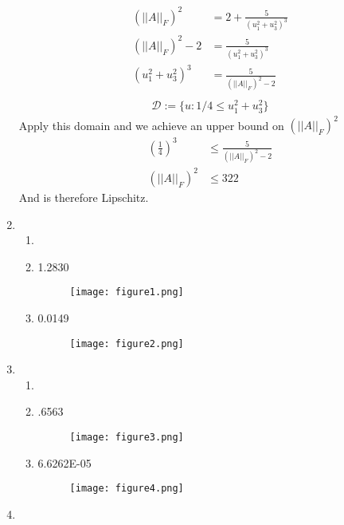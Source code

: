\documentclass{article}
\begin{document}
\begin{enumerate}
\begin{equation*}
\begin{split}
(\left|\left| A\right|\right|_{F})^{2} & = 2 + \frac{5}{(u_{1}^{2}+u_{3}^{2})^{3}}\\
(\left|\left| A\right|\right|_{F})^{2}-2 & = \frac{5}{(u_{1}^{2}+u_{3}^{2})^{3}}\\
(u_{1}^{2}+u_{3}^{2})^{3} & = \frac{5}{(\left|\left| A\right|\right|_{F})^{2}-2}\\
\end{split}
\end{equation*}
\begin{equation*}
\begin{split}
\mathcal{D} := \{u: 1/4 \leq u_{1}^{2} + u_{3}^{2} \}
\end{split}
\end{equation*}
Apply this domain and we achieve an upper bound on $(\left|\left| A\right|\right|_{F})^{2}$
\begin{equation*}
\begin{split}
(\frac{1}{4})^{3} & \leq \frac{5}{(\left|\left| A\right|\right|_{F})^{2}-2}\\
(\left|\left| A\right|\right|_{F})^{2} &\leq 322
\end{split}
\end{equation*}
And is therefore Lipschitz.
\item
\begin{enumerate}
\item
\item
1.2830
		\begin{figure}[H]
		\texttt{[image: figure1.png]}
		\end{figure}
\item
0.0149
		\begin{figure}[H]
		\texttt{[image: figure2.png]}
		\end{figure}
\end{enumerate}
\item
\begin{enumerate}
\item
\item
.6563
		\begin{figure}[H]
		\texttt{[image: figure3.png]}
		\end{figure}
\item
6.6262E-05 \\
		\begin{figure}[H]
		\texttt{[image: figure4.png]}
		\end{figure}
\newpage
\end{enumerate}
\item

\end{enumerate}
\end{document}
